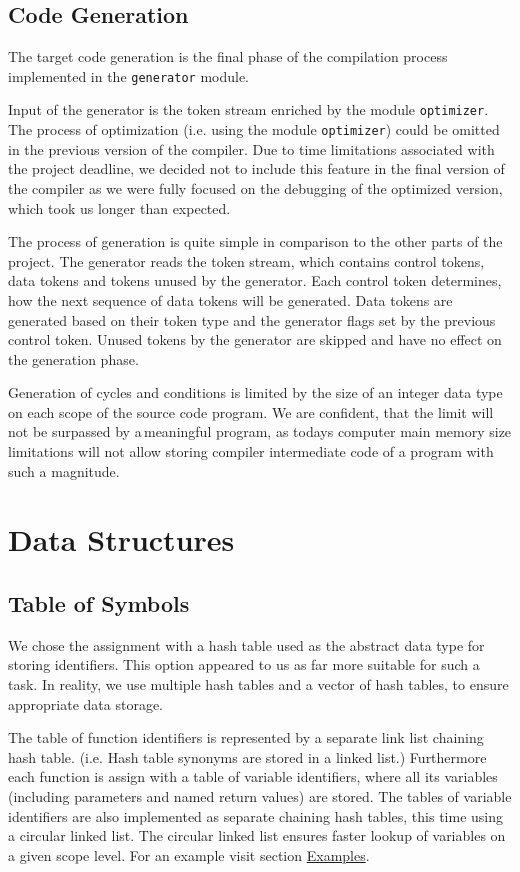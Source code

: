 \documentclass[12pt]{article}
\begin{document}
\subsection{Code Generation}
\label{sec:generation}
The target code generation is the final phase of the compilation process implemented in the \texttt{generator} module. \par 
Input of the generator is the token stream enriched by the module \texttt{optimizer}. The process of optimization (i.e. using the module \texttt{optimizer}) could be omitted in the previous version of the compiler. Due to time limitations associated with the project deadline, we decided not to include this feature in the final version of the compiler as we were fully focused on the debugging of the optimized version, which took us longer than expected.\par 
The process of generation is quite simple in comparison to the other parts of the project. The generator reads the token stream, which contains control tokens, data tokens and tokens unused by the generator. Each control token determines, how the next sequence of data tokens will be generated. Data tokens are generated based on their token type and the generator flags set by the previous control token. Unused tokens by the generator are skipped and have no effect on the generation phase.\par
Generation of cycles and conditions is limited by the size of an integer data type on each scope of the source code program. We are confident, that the limit will not be surpassed by a\,meaningful program, as todays computer main memory size limitations will not allow storing compiler intermediate code of a program with such a magnitude. 


\section{Data Structures}
\label{sec:datastruct}
\subsection{Table of Symbols}
We chose the assignment with a hash table used as the abstract data type for storing identifiers. This option appeared to us as far more suitable for such a task. In reality, we use multiple hash tables and a vector of hash tables, to ensure appropriate data storage.\par
The table of function identifiers is represented by a separate link list chaining hash table. (i.e. Hash table synonyms are stored in a linked list.) Furthermore each function is assign with a table of variable identifiers, where all its variables (including parameters and named return values) are stored. The tables of variable identifiers are also implemented as separate chaining hash tables, this time using a circular linked list. The circular linked list ensures faster lookup of variables on a given scope level. For an example visit section \hyperref[sec:examples]{Examples}.
\end{document}
